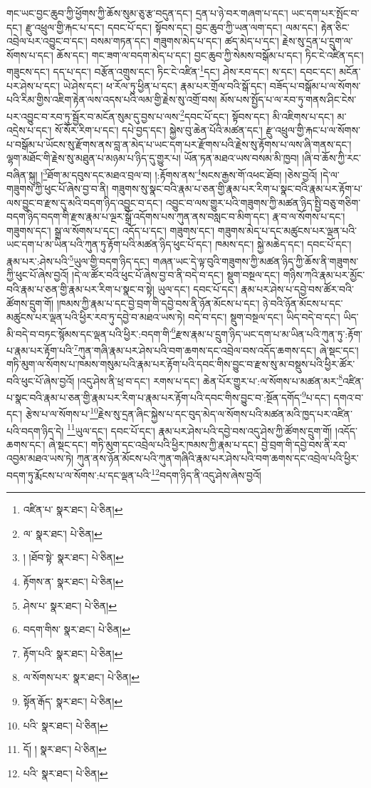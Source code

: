 གང་ཡང་བྱང་ཆུབ་ཀྱི་ཕྱོགས་ཀྱི་ཆོས་སུམ་ཅུ་རྩ་བདུན་དང་། དྲན་པ་ཉེ་བར་གཞག་པ་དང་། ཡང་དག་པར་སྤོང་བ་དང་། རྫུ་འཕྲུལ་གྱི་རྐང་པ་དང་། དབང་པོ་དང་། སྟོབས་དང་། བྱང་ཆུབ་ཀྱི་ཡན་ལག་དང་། ལམ་དང་། རྟེན་ཅིང་འབྲེལ་པར་འབྱུང་བ་དང་། བསམ་གཏན་དང་། གཟུགས་མེད་པ་དང་། ཚད་མེད་པ་དང་། རྗེས་སུ་དྲན་པ་དྲུག་ལ་སོགས་པ་དང་། ཆོས་དང་། གང་ཟག་ལ་བདག་མེད་པ་དང་། བྱང་ཆུབ་ཀྱི་སེམས་བསྒོམ་པ་དང་། ཏིང་ངེ་འཛིན་དང་། གཟུངས་དང་། དད་པ་དང་། བརྩོན་འགྲུས་དང་། ཏིང་ངེ་འཛིན་\footnote{འཛིན་པ་  སྣར་ཐང་།  པེ་ཅིན། }དང་། ཤེས་རབ་དང་། ས་དང་། དབང་དང་། མངོན་པར་ཤེས་པ་དང་། ཡེ་ཤེས་དང་། ཕ་རོལ་ཏུ་ཕྱིན་པ་དང་། རྣམ་པར་གྲོལ་བའི་སྒོ་དང་། བཟོད་པ་བསྒོམ་པ་ལ་སོགས་པའི་རིམ་གྱིས་འཇིག་རྟེན་ལས་འདས་པའི་ལམ་གྱི་རྗེས་སུ་འགྲོ་བས། མོས་པས་སྤྱོད་པ་ལ་རབ་ཏུ་གནས་ཤིང་ངེས་པར་འབྱུང་བ་རབ་ཏུ་སྦྱོར་བ་མངོན་སུམ་དུ་བྱས་པ་ལས་\footnote{ལ་  སྣར་ཐང་།  པེ་ཅིན། }དབང་པོ་དང་། སྟོབས་དང་། མི་འཇིགས་པ་དང་། མ་འདྲེས་པ་དང་། སོ་སོར་རིག་པ་དང་། དཔེ་བྱད་དང་། སྐྱེས་བུ་ཆེན་པོའི་མཚན་དང་། རྫུ་འཕྲུལ་གྱི་རྐང་པ་ལ་སོགས་པ་བསྒོམ་པ་ཡོངས་སུ་རྫོགས་ནས་བླ་ན་མེད་པ་ཡང་དག་པར་རྫོགས་པའི་རྗེས་སུ་རྟོགས་པ་ལས་ཞི་གནས་དང་། ལྷག་མཐོང་གི་རྗེས་སུ་མཐུན་པ་མཉམ་པ་ཉིད་དུ་གྱུར་པ། ཡོན་ཏན་མཐའ་ཡས་བསམ་མི་ཁྱབ། །ཞི་བ་ཆོས་ཀྱི་རང་བཞིན་སྐུ། །\footnote{། །ཐོབ་སྟེ་  སྣར་ཐང་།  པེ་ཅིན། }ཐོག་མ་དབུས་དང་མཐའ་བྲལ་བ། །:རྟོགས་ནས་\footnote{རྟོགས་ན་  སྣར་ཐང་།  པེ་ཅིན། }སངས་རྒྱས་གོ་འཕང་ཐོབ། །ཅེས་བྱའོ། །དེ་ལ་གཟུགས་ཀྱི་ཕུང་པོ་ཞེས་བྱ་བ་ནི། གཟུགས་སུ་སྣང་བའི་རྣམ་པ་ཅན་གྱི་རྣམ་པར་རིག་པ་སྣང་བའི་རྣམ་པར་རྟོག་པ་ལས་བྱུང་བ་རྫས་དུ་མའི་བདག་ཉིད་འབྱུང་བ་དང་། འབྱུང་བ་ལས་གྱུར་པའི་གཟུགས་ཀྱི་མཚན་ཉིད་སྤྱི་བཅུ་གཅིག་བདག་ཉིད་བདག་གི་རྫས་རྣམ་པ་ལྔར་སྒྲོ་འདོགས་པས་ཀུན་ནས་བསླང་བ་མིག་དང་། རྣ་བ་ལ་སོགས་པ་དང་། གཟུགས་དང་། སྒྲ་ལ་སོགས་པ་དང་། འདོད་པ་དང་། གཟུགས་དང་། གཟུགས་མེད་པ་དང་མཚུངས་པར་ལྡན་པའི་ཡང་དག་པ་མ་ཡིན་པའི་ཀུན་ཏུ་རྟོག་པའི་མཚན་ཉིད་ཕུང་པོ་དང་། ཁམས་དང་། སྐྱེ་མཆེད་དང་། དབང་པོ་དང་། རྣམ་པར་:ཤེས་པའི་\footnote{ཤེས་པ་  སྣར་ཐང་།  པེ་ཅིན། }ཡུལ་གྱི་བདག་ཉིད་དང་། གཞན་ཡང་དེ་ལྟ་བུའི་གཟུགས་ཀྱི་མཚན་ཉིད་ཀྱི་ཆོས་ནི་གཟུགས་ཀྱི་ཕུང་པོ་ཞེས་བྱའོ། །དེ་ལ་ཚོར་བའི་ཕུང་པོ་ཞེས་བྱ་བ་ནི་བདེ་བ་དང་། སྡུག་བསྔལ་དང་། གཉིས་ཀའི་རྣམ་པར་མྱོང་བའི་རྣམ་པ་ཅན་གྱི་རྣམ་པར་རིག་པ་སྣང་བ་སྟེ། ཡུལ་དང་། དབང་པོ་དང་། རྣམ་པར་ཤེས་པ་དབྱེ་བས་ཚོར་བའི་ཚོགས་དྲུག་གོ། །ཁམས་ཀྱི་རྣམ་པ་དང་བྱེ་བྲག་གི་དབྱེ་བས་ནི་ཉོན་མོངས་པ་དང་། ཉེ་བའི་ཉོན་མོངས་པ་དང་མཚུངས་པར་ལྡན་པའི་ཕྱིར་རབ་ཏུ་དབྱེ་བ་མཐའ་ཡས་ཏེ། བདེ་བ་དང་། སྡུག་བསྔལ་དང་། ཡིད་བདེ་བ་དང་། ཡིད་མི་བདེ་བ་བཏང་སྙོམས་དང་ལྡན་པའི་ཕྱིར་:བདག་གི་\footnote{བདག་གིས་  སྣར་ཐང་།  པེ་ཅིན། }རྫས་རྣམ་པ་དྲུག་ཉིད་ཡང་དག་པ་མ་ཡིན་པའི་ཀུན་ཏུ་:རྟོག་པ་རྣམ་པར་རྟོག་པའི་\footnote{རྟོག་པའི་  སྣར་ཐང་།  པེ་ཅིན། }ཀུན་གཞི་རྣམ་པར་ཤེས་པའི་བག་ཆགས་དང་འབྲེལ་བས་འདོད་ཆགས་དང་། ཞེ་སྡང་དང་། གཏི་མུག་ལ་སོགས་པ་ཁམས་གསུམ་པའི་རྣམ་པར་རྟོག་པའི་དབང་གིས་བྱུང་བ་རྫས་སུ་མ་བསྡུས་པའི་ཕྱིར་ཚོར་བའི་ཕུང་པོ་ཞེས་བྱའོ། །འདུ་ཤེས་ནི་ཕྲ་བ་དང་། རགས་པ་དང་། ཆེན་པོར་གྱུར་པ་:ལ་སོགས་པ་མཚན་མར་\footnote{ལ་སོགས་པར་  སྣར་ཐང་།  པེ་ཅིན། }འཛིན་པ་སྣང་བའི་རྣམ་པ་ཅན་གྱི་རྣམ་པར་རིག་པ་རྣམ་པར་རྟོག་པའི་དབང་གིས་བྱུང་བ་:སྔོན་དགོད་\footnote{སྟོན་རྒོད་  སྣར་ཐང་།  པེ་ཅིན། }པ་དང་། དགའ་བ་དང་། རྩེས་པ་ལ་སོགས་པ་\footnote{པའི་  སྣར་ཐང་།  པེ་ཅིན། }རྗེས་སུ་དྲན་ཞིང་སྐྱེས་པ་དང་བུད་མེད་ལ་སོགས་པའི་མཚན་མའི་ཁྱད་པར་འཛིན་པའི་བདག་ཉིད་དེ། \footnote{དོ། །   སྣར་ཐང་།  པེ་ཅིན། }ཡུལ་དང་། དབང་པོ་དང་། རྣམ་པར་ཤེས་པའི་དབྱེ་བས་འདུ་ཤེས་ཀྱི་ཚོགས་དྲུག་གོ། །འདོད་ཆགས་དང་། ཞེ་སྡང་དང་། གཏི་མུག་དང་འབྲེལ་པའི་ཕྱིར་ཁམས་ཀྱི་རྣམ་པ་དང་། བྱེ་བྲག་གི་དབྱེ་བས་ནི་རབ་འབྱམ་མཐའ་ཡས་ཏེ། ཀུན་ནས་ཉོན་མོངས་པའི་ཀུན་གཞིའི་རྣམ་པར་ཤེས་པའི་བག་ཆགས་དང་འབྲེལ་པའི་ཕྱིར་བདག་ཏུ་རྨོངས་པ་ལ་སོགས་:པ་དང་ལྡན་པའི་\footnote{པའི་  སྣར་ཐང་།  པེ་ཅིན། }བདག་ཉིད་ནི་འདུ་ཤེས་ཞེས་བྱའོ། 